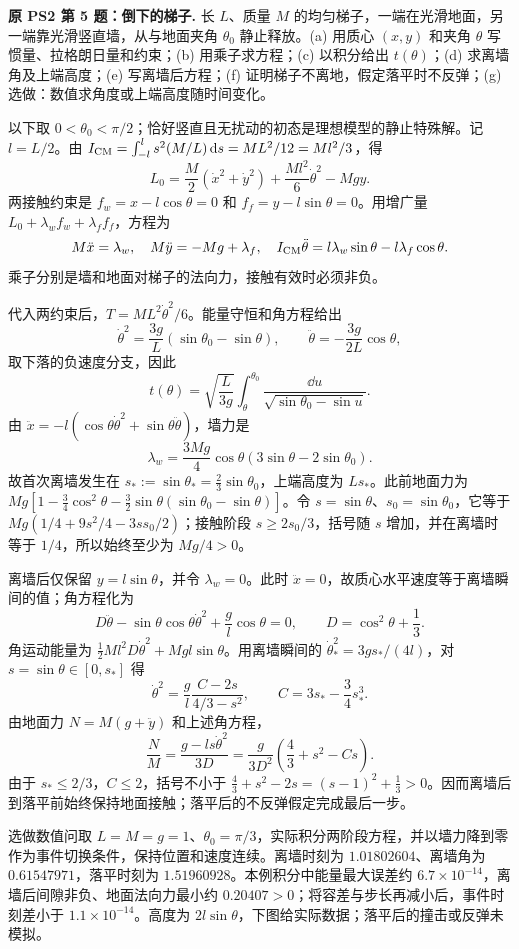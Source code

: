\begin{example}
\textbf{原 PS2 第 5 题：倒下的梯子.} 
长 $L$、质量 $M$ 的均匀梯子，一端在光滑地面，另一端靠光滑竖直墙，从与地面夹角 $\theta_0$ 静止释放。(a) 用质心 $(x,y)$ 和夹角 $\theta$ 写惯量、拉格朗日量和约束；(b) 用乘子求方程；(c) 以积分给出 $t(\theta)$；(d) 求离墙角及上端高度；(e) 写离墙后方程；(f) 证明梯子不离地，假定落平时不反弹；(g) 选做：数值求角度或上端高度随时间变化。
\end{example}
\begin{solution}
以下取 $0<\theta_0<\pi/2$；恰好竖直且无扰动的初态是理想模型的静止特殊解。记 $l=L/2$。由 $I_{\rm CM}=\int_{-l}^l s^2(M/L)\,\mathrm d s=ML^2/12=Ml^2/3$，得
\[
 L_0=\frac M2(\dot x^2+\dot y^2)+\frac{Ml^2}{6}\dot\theta^2-Mgy.
\]
两接触约束是 $f_w=x-l\cos\theta=0$ 和 $f_f=y-l\sin\theta=0$。用增广量 $L_0+\lambda_wf_w+\lambda_ff_f$，方程为
\[
 M\ddot x=\lambda_w,\quad M\ddot y=-Mg+\lambda_f,\quad
 I_{\rm CM}\ddot\theta=l\lambda_w\sin\theta-l\lambda_f\cos\theta.
\]
乘子分别是墙和地面对梯子的法向力，接触有效时必须非负。

代入两约束后，$T=ML^2\dot\theta^2/6$。能量守恒和角方程给出
\[
 \dot\theta^2=\frac{3g}{L}(\sin\theta_0-\sin\theta),\qquad
 \ddot\theta=-\frac{3g}{2L}\cos\theta,
\]
取下落的负速度分支，因此
\[
 t(\theta)=\sqrt{\frac{L}{3g}}\int_\theta^{\theta_0}
 \frac{\dd u}{\sqrt{\sin\theta_0-\sin u}}.
\]
由 $\ddot x=-l(\cos\theta\dot\theta^2+\sin\theta\ddot\theta)$，墙力是
\[
 \lambda_w=\frac{3Mg}{4}\cos\theta(3\sin\theta-2\sin\theta_0).
\]
故首次离墙发生在 $s_*:=\sin\theta_*=\frac23\sin\theta_0$，上端高度为 $L s_*$。此前地面力为 $Mg[1-\frac34\cos^2\theta-\frac32\sin\theta(\sin\theta_0-\sin\theta)]$。令 $s=\sin\theta$、$s_0=\sin\theta_0$，它等于 $Mg(1/4+9s^2/4-3ss_0/2)$；接触阶段 $s\ge2s_0/3$，括号随 $s$ 增加，并在离墙时等于 $1/4$，所以始终至少为 $Mg/4>0$。

离墙后仅保留 $y=l\sin\theta$，并令 $\lambda_w=0$。此时 $\ddot x=0$，故质心水平速度等于离墙瞬间的值；角方程化为
\[
 D\ddot\theta-\sin\theta\cos\theta\dot\theta^2+\frac gl\cos\theta=0,
 \qquad D=\cos^2\theta+\frac13.
\]
角运动能量为 $\frac12Ml^2D\dot\theta^2+Mgl\sin\theta$。用离墙瞬间的 $\dot\theta_*^2=3g s_*/(4l)$，对 $s=\sin\theta\in[0,s_*]$ 得
\[
 \dot\theta^2=\frac gl\frac{C-2s}{4/3-s^2},\qquad
 C=3s_*-\frac34s_*^3.
\]
由地面力 $N=M(g+\ddot y)$ 和上述角方程，
\[
 \frac NM=\frac{g-ls\dot\theta^2}{3D}
 =\frac g{3D^2}\left(\frac43+s^2-Cs\right).
\]
由于 $s_*\le2/3$，$C\le2$，括号不小于 $\frac43+s^2-2s=(s-1)^2+\frac13>0$。因而离墙后到落平前始终保持地面接触；落平后的不反弹假定完成最后一步。

选做数值问取 $L=M=g=1$、$\theta_0=\pi/3$，实际积分两阶段方程，并以墙力降到零作为事件切换条件，保持位置和速度连续。离墙时刻为 $1.01802604$、离墙角为 $0.61547971$，落平时刻为 $1.51960928$。本例积分中能量最大误差约 $6.7\times10^{-14}$，离墙后间隙非负、地面法向力最小约 $0.20407>0$；将容差与步长再减小后，事件时刻差小于 $1.1\times10^{-14}$。高度为 $2l\sin\theta$，下图给实际数据；落平后的撞击或反弹未模拟。

\end{solution}

